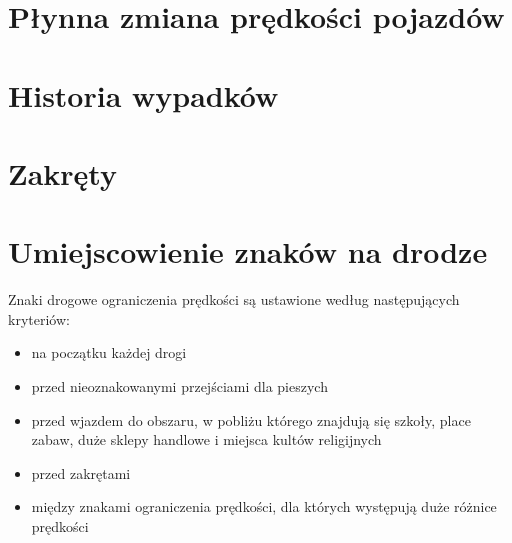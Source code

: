 \section{Płynna zmiana prędkości pojazdów}


\newpage
\section{Historia wypadków}


\newpage
\section{Zakręty}


\section{Umiejscowienie znaków na drodze}
\label{sec:speedLimitLocalization}
Znaki drogowe ograniczenia prędkości są ustawione według następujących kryteriów:
\begin{itemize}
\item na początku każdej drogi
\item przed nieoznakowanymi przejściami dla pieszych
\item przed wjazdem do obszaru, w pobliżu którego znajdują się szkoły, place zabaw, duże sklepy handlowe i miejsca kultów religijnych
\item przed zakrętami
\item między znakami ograniczenia prędkości, dla których występują duże różnice prędkości
\end{itemize}

